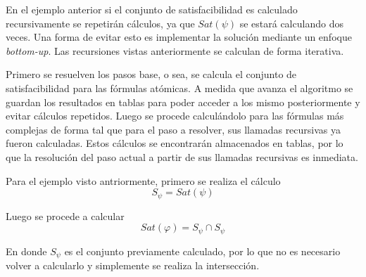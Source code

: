 En el ejemplo anterior si el conjunto de satisfacibilidad es calculado recursivamente
 se repetirán cálculos, ya que $Sat(\psi)$ se estará calculando dos veces.
Una forma de evitar esto es implementar la solución mediante un enfoque \textit{bottom-up}.
Las recursiones vistas anteriormente se calculan de forma iterativa.

Primero se resuelven los pasos base, o sea, se calcula el conjunto de
 satisfacibilidad para las fórmulas atómicas.
A medida que avanza el algoritmo se guardan los resultados en tablas para poder
 acceder a los mismo posteriormente y evitar cálculos repetidos.
Luego se procede calculándolo para las fórmulas más complejas de forma tal que
 para el paso a resolver, sus llamadas recursivas ya fueron calculadas.
Estos cálculos se encontrarán almacenados en tablas, por lo que la resolución
 del paso actual a partir de sus llamadas recursivas es inmediata.

Para el ejemplo visto antriormente, primero se realiza el cálculo
\[ S_\psi = Sat(\psi) \]

Luego se procede a calcular
\[ Sat(\varphi) = S_\psi \cap S_\psi \]

En donde $S_\psi$ es el conjunto previamente calculado, por lo que no es
 necesario volver a calcularlo y simplemente se realiza la intersección.
 